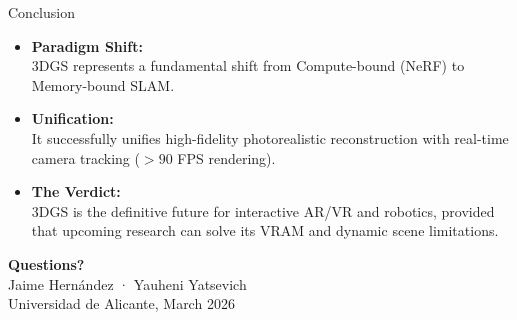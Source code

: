 \documentclass[10pt, aspectratio=169, xcolor={dvipsnames}]{beamer}
\begin{document}
\begin{frame}{Conclusion}
  \begin{itemize}
    \item \textbf{Paradigm Shift:}\\ 3DGS represents a fundamental shift from \alert{Compute-bound} (NeRF) to \alert{Memory-bound} SLAM.
    \vspace{0.8em}
    \item \textbf{Unification:}\\ It successfully unifies high-fidelity photorealistic reconstruction with real-time camera tracking ($>90$ FPS rendering).
    \vspace{0.8em}
    \item \textbf{The Verdict:}\\ 3DGS is the definitive future for interactive AR/VR and robotics, provided that upcoming research can solve its VRAM and dynamic scene limitations.
  \end{itemize}
\end{frame}

\begin{frame}[standout]
  \centering
  \LARGE \textbf{Questions?}\\[1em]
  \normalsize
  Jaime Hernández · Yauheni Yatsevich\\
  Universidad de Alicante, March 2026
\end{frame}
\end{document}
